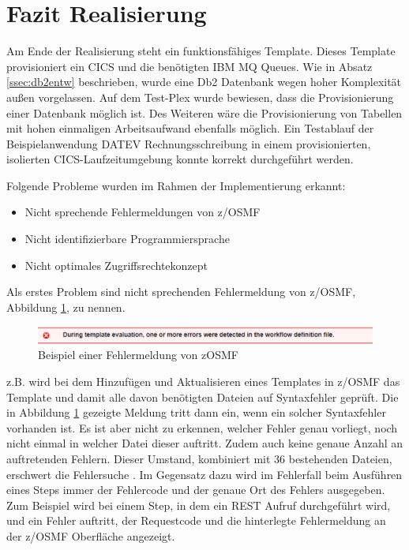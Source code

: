 \section{Fazit Realisierung}
Am Ende der Realisierung steht ein funktionsfähiges Template.
Dieses Template provisioniert ein CICS und die benötigten IBM MQ Queues.
Wie in Absatz \ref{ssec:db2entw} beschrieben, wurde eine Db2 Datenbank wegen hoher Komplexität außen vorgelassen.
Auf dem Test-Plex wurde bewiesen, dass die Provisionierung einer Datenbank möglich ist.
Des Weiteren wäre die Provisionierung von Tabellen mit hohen einmaligen Arbeitsaufwand ebenfalls möglich.
Ein Testablauf der Beispielanwendung DATEV Rechnungsschreibung in einem provisionierten, isolierten CICS-Laufzeitumgebung konnte korrekt durchgeführt werden.

Folgende Probleme wurden im Rahmen der Implementierung erkannt:

\begin{samepage}
\begin{itemize}
\item Nicht sprechende Fehlermeldungen von z/OSMF
\item Nicht identifizierbare Programmiersprache
\item Nicht optimales Zugriffsrechtekonzept
\end{itemize}
\end{samepage}

Als erstes Problem sind nicht sprechenden Fehlermeldung von z/OSMF, Abbildung \ref{fig:zosmffehler}, zu nennen.
\begin{figure}[h]
	\centering
	\includegraphics[width=\textwidth]{figures/zosmffehlermeldung.png}
	\caption{Beispiel einer Fehlermeldung von zOSMF}
	\label{fig:zosmffehler}
\end{figure}
z.B. wird bei dem Hinzufügen und Aktualisieren eines Templates in z/OSMF das Template und damit alle davon benötigten Dateien auf Syntaxfehler geprüft.
Die in Abbildung \ref{fig:zosmffehler} gezeigte Meldung tritt dann ein, wenn ein solcher Syntaxfehler vorhanden ist.
Es ist aber nicht zu erkennen, welcher Fehler genau vorliegt, noch nicht einmal in welcher Datei dieser auftritt.
Zudem auch keine genaue Anzahl an auftretenden Fehlern.
Dieser Umstand, kombiniert mit 36 bestehenden Dateien, erschwert die Fehlersuche .
Im Gegensatz dazu wird im Fehlerfall beim Ausführen eines Steps immer der Fehlercode und der genaue Ort des Fehlers ausgegeben.
Zum Beispiel wird bei einem Step, in dem ein REST Aufruf durchgeführt wird, und ein Fehler auftritt, der Requestcode und die hinterlegte Fehlermeldung an der z/OSMF Oberfläche angezeigt. 

